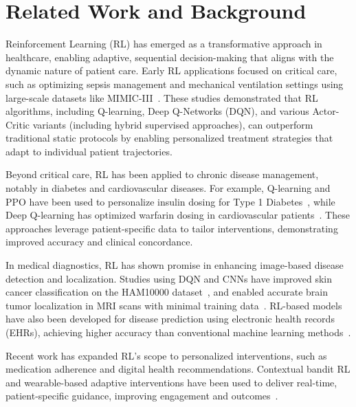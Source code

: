 \documentclass[runningheads]{llncs}
\begin{document}
\section{Related Work and Background}

Reinforcement Learning (RL) has emerged as a transformative approach in healthcare, enabling adaptive, sequential decision-making that aligns with the dynamic nature of patient care. Early RL applications focused on critical care, such as optimizing sepsis management and mechanical ventilation settings using large-scale datasets like MIMIC-III~\cite{wuValuebasedDeepReinforcement2023, yuSupervisedactorcriticReinforcementLearning2020}. These studies demonstrated that RL algorithms, including Q-learning, Deep Q-Networks (DQN), and various Actor-Critic variants (including hybrid supervised approaches), can outperform traditional static protocols by enabling personalized treatment strategies 
that adapt to individual patient trajectories.

Beyond critical care, RL has been applied to chronic disease management, notably in diabetes and cardiovascular diseases. For example, Q-learning and PPO have been used to personalize insulin dosing for Type 1 Diabetes~\cite{javadReinforcementLearningBased2019, zhaoSafeenhancedFullyClosedloop2025}, while Deep Q-learning has optimized warfarin dosing in cardiovascular patients~\cite{zadehOptimizingWarfarinDosing2023}. These approaches leverage patient-specific data to tailor interventions, demonstrating improved accuracy and clinical concordance.

In medical diagnostics, RL has shown promise in enhancing image-based disease detection and localization. Studies using DQN and CNNs have improved skin cancer classification on the HAM10000 dataset~\cite{barataReinforcementLearningModel2023}, and enabled accurate brain tumor localization in MRI scans with minimal training data~\cite{stemberReinforcementLearningUsing2022}. RL-based models have also been developed for disease prediction using electronic health records (EHRs), achieving higher accuracy than conventional machine learning methods~\cite{abdelazizDeepQNetworkDQN2025}.

Recent work has expanded RL’s scope to personalized interventions, such as medication adherence and digital health recommendations. Contextual bandit RL and wearable-based adaptive interventions have been used to deliver real-time, patient-specific guidance, improving engagement and outcomes~\cite{ismailAdvancingPatientCare2024, tripathyReinforcementLearningOptimizing2024}.
\end{document}
